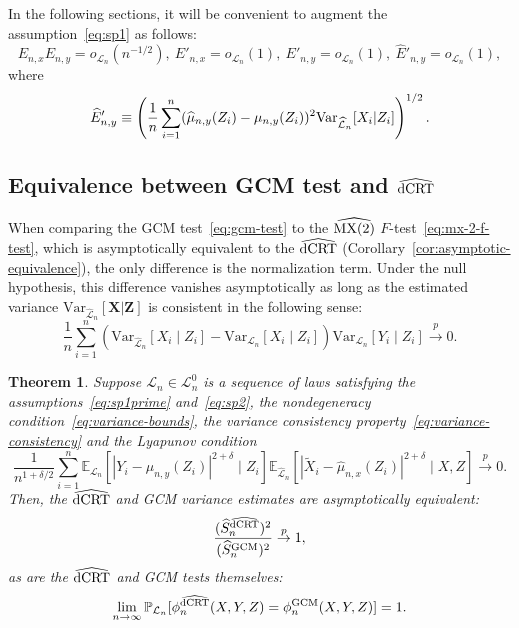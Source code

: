 \documentclass[12pt]{article}
\newtheorem{theorem}{Theorem}
\theoremstyle{definition}
\theoremstyle{remark}
\newcommand\linktoproof[1]{ {\normalfont[{\hyperlink{#1}{Proof}}]} }
\newcommand{\E}{\mathbb E}								%
\newcommand{\V}{\mathrm{Var}}							%
\renewcommand{\P}{\mathbb{P}}							%
\newcommand{\convp}{\overset p \rightarrow}             %
\newcommand{\prx}{\bm X}								%
\newcommand{\srx}{X}									%
\newcommand{\prz}{\bm Z}								%
\newcommand{\srz}{Z}									%
\newcommand{\srxk}{\widetilde X}						%
\newcommand{\sry}{Y}									%
\newcommand{\law}{\mathcal L}							%
\newcommand{\nulllaws}{\mathscr L^0}					%
\newcommand{\lawhat}{\widehat{\mathcal L}}				%
\newcommand{\GCM}{\textnormal{GCM}}						%
\newcommand{\dCRThat}{\widehat{\textnormal{dCRT}}}		%
\newcommand{\MXtwohat}{\widehat{\textnormal{MX(2)}}}		%
\begin{document}
	In the following sections, it will be convenient to augment the assumption~\eqref{eq:sp1} as follows:
	\begin{equation}
		E_{n, x} E_{n, y}  = o_{\law_n}(n^{-1/2}),\  E'_{n, x} = o_{\law_n}(1),\  E'_{n, y} = o_{\law_n}(1),\ \widehat E'_{n,y} = o_{\law_n}(1),
		\label{eq:sp1prime} \tag{SP1'}
	\end{equation}
	where
	\begin{equation}
		\widehat E'_{n, y} \equiv \left(\frac{1}{n}\sum_{i = 1}^n (\widehat \mu_{n,y}(\srz_i) -  \mu_{n,y}(\srz_i))^2\textnormal{Var}_{\lawhat_n}[\srx_i|\srz_i]\right)^{1/2}.
	\end{equation}
	
	\subsection{Equivalence between GCM test and $\dCRThat$}
	
	When comparing the GCM test~\eqref{eq:gcm-test} to the $\MXtwohat$ $F$-test~\eqref{eq:mx-2-f-test}, which is asymptotically equivalent to the $\dCRThat$ (Corollary~\ref{cor:asymptotic-equivalence}), the only difference is the normalization term. Under the null hypothesis, this difference vanishes asymptotically as long as the estimated variance $\V_{\lawhat_n}[\prx|\prz]$ is consistent in the following sense:
	\begin{equation}
		\frac{1}{n} \sum_{i=1}^n (\V_{\lawhat_n}[\srx_i\mid \srz_i]-\V_{\law_n}[\srx_i\mid \srz_i])\V_{\law_n}[Y_i \mid Z_i] \convp 0.
		\label{eq:variance-consistency}
	\end{equation}
	
	\begin{theorem} \label{thm:equivalence} \linktoproof{proof:thm:equivalence}
		Suppose $\law_n \in \nulllaws_n$ is a sequence of laws satisfying the assumptions~\eqref{eq:sp1prime} and~\eqref{eq:sp2}, the nondegeneracy condition~\eqref{eq:variance-bounds}, the variance consistency property~\eqref{eq:variance-consistency} and the Lyapunov condition 
		\begin{equation}
			\frac{1}{n^{1+\delta/2}} \sum_{i=1}^n \E_{\law_n}\left[|\sry_i-\mu_{n,y}(\srz_i)|^{2+\delta}\mid \srz_i\right]\E_{\lawhat_n}[|\srxk_i-\widehat\mu_{n,x}(\srz_i)|^{2+\delta}\mid \srx,\srz] \convp 0.
			\label{eq:lyapunov-condition-2} \tag{Lyap-2}
		\end{equation}
		Then, the $\dCRThat$ and GCM variance estimates are asymptotically equivalent:
		\begin{equation}
			\frac{(\widehat S_n^{\dCRThat})^2}{(\widehat S_{n}^{\GCM})^2} \convp 1,
			\label{eq:asymptotic-variance-equivalence}
		\end{equation}
		as are the $\dCRThat$ and GCM tests themselves:
		\begin{equation}
			\lim_{n \rightarrow \infty} \P_{\law_n}[\phi^{\dCRThat}_{n}(\srx, \sry, \srz) = \phi^{\GCM}_{n}(\srx, \sry, \srz)] = 1.
			\label{eq:asymptotic-test-equivalence}
		\end{equation}
	\end{theorem}
	
\end{document}
